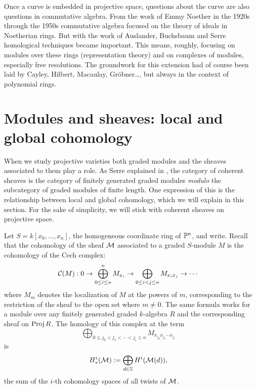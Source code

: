 
Once a curve is embedded in projective space, questions about the curve are also questions in commutative algebra. From the work of Emmy Noether in the 1920s through the 1950s commutative algebra focused on the theory of ideals in Noetherian rings. But with the work of Auslander, Buchsbaum and Serre homological techniques became important. This means, roughly, focusing on modules over these rings (representation theory) and on complexes of modules, especially free resolutions. The groundwork for this extension had of course been laid by Cayley, Hilbert, Macaulay, Gr\"obner\dots, but always in the context of polynomial rings. 

\section{Modules and sheaves: local and global cohomology}

When we study projective varieties both graded modules and the sheaves associated to them play a role. As Serre explained in \cite{FAC}, the category of coherent sheaves is the category of finitely generated graded modules \emph{modulo} the subcategory of graded modules of finite length. One expression of this is the relationship between local and global cohomology, which we will explain in this section. For the sake of simplicity, we will stick with coherent sheaves on projective space.

Let $S= k[x_{0}, \dots, x_{n}]$, the homogeneous coordinate ring of $\PP^{n}$, and write. Recall that the cohomology of the sheaf $\cM$ associated to a graded $S$-module $M$ is the cohomology of the Cech complex:
$$
\cC(M): 0\to \bigoplus_{0\leq i \leq n}^{n} M_{x_{i}} \to \bigoplus_{0\leq i<j\leq n} M_{x_{i}x_{j}} \to \cdots
$$
where $M_{m}$ denotes the localization of $M$ at the powers of $m$, corresponding to the restriction of the sheaf to the open set where $m \neq 0$. The same formula works for a module 
over any finitely generated graded $k$-algebra $R$ and the corresponding sheaf on $\Proj R$.
The homology of this complex at the term
$$
\bigoplus_{0\leq j_{0}<j_{1}<\cdots<j_{i}\leq n} M_{x_{j_{0}}x_{j_{1}}\cdots x_{j_{i}}}
$$
is 
$$
H^{i}_{*}(\cM):= \bigoplus_{d\in \ZZ} H^{i}(\cM(d)),
$$
the sum of the $i$-th cohomology spaces of all twists of $\cM$.

